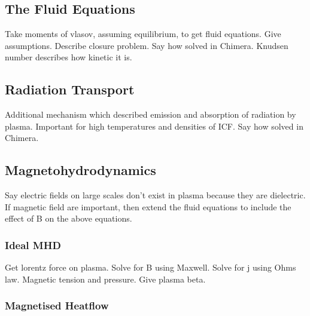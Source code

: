\subsection{The Fluid Equations}%
\label{sec:theory_fluid}

Take moments of vlasov, assuming equilibrium, to get fluid equations.
Give assumptions.
Describe closure problem.
Say how solved in Chimera.
Knudsen number describes how kinetic it is.

\subsection{Radiation Transport}%
\label{sec:theory_kineticheatflow}

Additional mechanism which described emission and absorption of radiation by plasma.
Important for high temperatures and densities of ICF.
Say how solved in Chimera.

\subsection{Magnetohydrodynamics}%
\label{sec:theory_MHD}

Say electric fields on large scales don't exist in plasma because they are dielectric.
If magnetic field are important, then extend the fluid equations to include the effect of B on the above equations.

\subsubsection{Ideal MHD}%
\label{sec:theory_idealMHD}

Get lorentz force on plasma.
Solve for B using Maxwell.
Solve for j using Ohms law.
Magnetic tension and pressure.
Give plasma beta.

\subsubsection{Magnetised Heatflow}%
\label{sec:theory_magheatflow}

